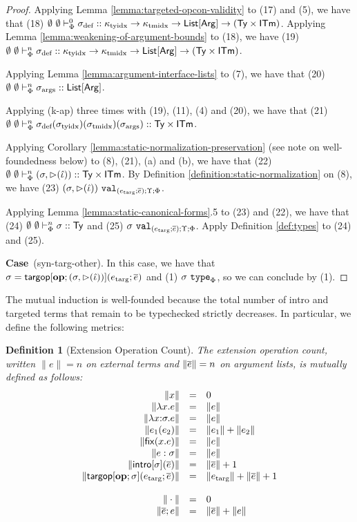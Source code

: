 \documentclass[12pt]{article}
\newtheorem{definition}{Definition}
\newcommand{\pfcase}[1]{\textbf{Case}~#1. }
\begin{document}
\begin{proof}
Applying Lemma \ref{lemma:targeted-opcon-validity} to (17) and (5), we have that (18) $\emptyset~\emptyset \vdash_{\Phi}^{0} \sigma_\text{def} :: \kappa_\text{tyidx} \rightarrow \kappa_\text{tmidx} \rightarrow {\sf List}[{\sf Arg}] \rightarrow ({\sf Ty} \times {\sf ITm})$. Applying Lemma \ref{lemma:weakening-of-argument-bounds} to (18), we have (19) $\emptyset~\emptyset \vdash_{\Phi}^{n} \sigma_\text{def} :: \kappa_\text{tyidx} \rightarrow \kappa_\text{tmidx} \rightarrow {\sf List}[{\sf Arg}] \rightarrow ({\sf Ty} \times {\sf ITm})$.

Applying Lemma \ref{lemma:argument-interface-lists} to (7), we have that (20) $\emptyset~\emptyset \vdash_{\Phi}^{n} \sigma_\text{args} :: {\sf List}[{\sf Arg}]$. 

Applying (k-ap) three times with (19), (11), (4) and (20), we have that (21) $\emptyset~\emptyset \vdash_{\Phi}^{n} \sigma_\text{def}(\sigma_\text{tyidx})(\sigma_\text{tmidx})(\sigma_\text{args}) :: {\sf Ty}\times{\sf ITm}$. 

Applying Corollary \ref{lemma:static-normalization-preservation} (see note on well-foundedness below) to (8), (21), (a) and (b), we have that (22) $\emptyset~\emptyset \vdash_{\Phi}^{n} (\sigma, {\rhd}(\hat{\iota})) :: {\sf Ty}\times{\sf ITm}$. By Definition \ref{definition:static-normalization} on (8), we have (23) $(\sigma, {\rhd}(\hat{\iota}))~\mathtt{val}_{(e_\text{targ}; \overline{e}); \Upsilon; \Phi}$. 

Applying Lemma \ref{lemma:static-canonical-forms}.5 to (23) and (22), we have that (24) $\emptyset~\emptyset \vdash_{\Phi}^{n} \sigma :: {\sf Ty}$ and (25) $\sigma~\mathtt{val}_{(e_\text{targ}; \overline{e}); \Upsilon; \Phi}$.  Apply Definition \ref{def:types} to (24) and (25).

\pfcase{(syn-targ-other)} In this case, we have that $\sigma={\sf targop}[\textbf{op}; (\sigma, {\rhd}(\hat{\iota}))](e_\text{targ}; \overline{e})$ and (1) $\sigma~\mathtt{type}_{\Phi}$, so we can conclude by (1).
\end{proof}
The mutual induction is well-founded because the total number of intro and targeted terms that remain to be typechecked strictly decreases. In particular, we define the following metrics:

\newcommand{\esize}[1]{\|#1\|}

\begin{definition}[Extension Operation Count] The extension operation count, written $\esize{e}=n$ on external terms and $\esize{\es}=n$ on argument lists, is mutually defined as follows:
\[\begin{array}{rcl}
\esize{x} & = & 0\\
\esize{\eanalam{x}{e}} & = & \esize{e}\\
\esize{\elam{\st}{x}{e}} & = & \esize{e}\\
\esize{\eap{e_1}{e_2}} & = & \esize{e_1} + \esize{e_2}\\
\esize{\efix{x}{e}} & = & \esize{e}\\
\esize{e : \st} & = & \esize{e}\\
\esize{\eintro{\st}{\es}} & = & \esize{\es} + 1\\
\esize{\etarg{\opname{op}}{\st}{e_\text{targ}}{\es}} & = & \esize{e_\text{targ}} + \esize{\es} + 1\\
\\
\esize{\cdot} & = & 0\\
\esize{\es; e} & = & \esize{\es} + \esize{e}
\end{array}\]
\end{definition}
\end{document}
